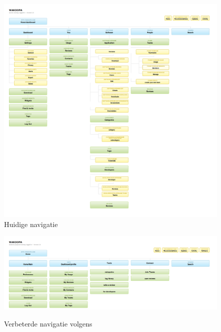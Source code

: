       \begin{figure}
      \begin{center}
      \caption{Huidige navigatie}
        \includegraphics[width=\textwidth]{../images/currentnav}
      \end{center}
    \end{figure}

    \begin{figure}
      \begin{center}
      \caption{Verbeterde navigatie volgens \cite{Hoekman2008}}
        \includegraphics[width=\textwidth]{../images/miskeetonav}
      \label{miskeetonav2}
      \end{center}
    \end{figure}

